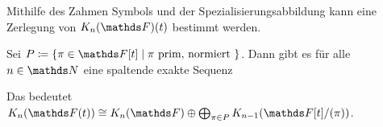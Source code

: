 \documentclass[ngerman,fontsize=11pt, paper=a4, parskip=half, titlepage=true, toc=bib]{scrartcl}
\begin{document}
Mithilfe des Zahmen Symbols und der Spezialisierungsabbildung kann
eine Zerlegung von $\KnF(t)$ bestimmt werden.

\begin{Satz}\label{milnorfolge}
  Sei $P\coloneqq \{\pi\in \F[t]\mid \pi\text{ prim, normiert }\}$.
  Dann gibt es für alle $n\in\N$ eine spaltende exakte Sequenz
  \begin{center}
  \end{center}
  Das bedeutet
  $\K_n(\Ft )\cong\KnF\oplus\bigoplus_{\pi\in P}K_{n-1}(\F[t]/(\pi))$.
\end{Satz}
\end{document}

